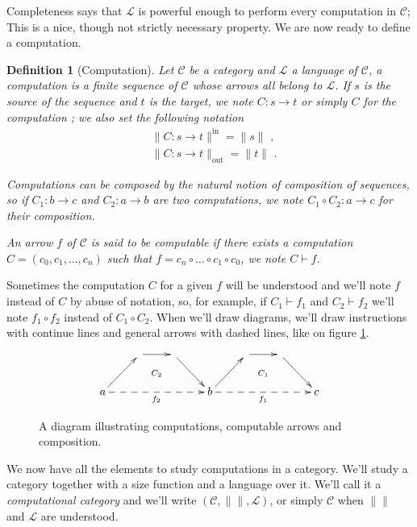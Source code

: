 \documentclass{article}
\newcommand{\cat}[1]{\mathscr{#1}}
\newcommand{\C}{\cat{C}}
\renewcommand{\L}{\cat{L}}
\newcommand{\comp}{\circ}
\newcommand{\size}[1]{\lVert#1\rVert}
\newcommand{\sizein}[1]{\size{#1}^\mathrm{in}}
\newcommand{\sizeout}[1]{\size{#1}_\mathrm{out}}
\newcommand{\ra}{\rightarrow}
\newcommand{\computes}{\vdash}
\newtheorem{definition}{Definition}
\begin{document}
  Completeness says that $\L$ is powerful enough to perform every
  computation in $\C$; This is a nice, though not strictly necessary
  property. We are now ready to define a computation.

  \begin{definition}[Computation]
    Let $\C$ be a category and $\L$ a language of $\C$, a
    \emph{computation} is a finite sequence of $\C$ whose arrows all
    belong to $\L$. If $s$ is the source of the sequence and $t$ is
    the target, we note $C:s\ra t$ or simply $C$ for the
    computation ; we also set the following notation
    \begin{align*}
      &\sizein{C:s\ra t} = \size{s} \text{ ,}\\
      &\sizeout{C:s\ra t} = \size{t} \text{ .}
    \end{align*}
    
    Computations can be composed by the natural notion of composition
    of sequences, so if $C_1 : b\ra c$ and $C_2 : a\ra b$ are two
    computations, we note $C_1\comp C_2 : a\ra c$ for their
    composition.

    An arrow $f$ of $\C$ is said to be \emph{computable} if there
    exists a computation $C = (c_0, c_1,\ldots,c_n)$ such that $f =
    c_n\comp\ldots\comp c_1\comp c_0$, we note $C\computes f$.
  \end{definition}

  Sometimes the computation $C$ for a given $f$ will be understood and
  we'll note $f$ instead of $C$ by abuse of notation, so, for example,
  if $C_1\computes f_1$ and $C_2\computes f_2$ we'll note $f_1\comp
  f_2$ instead of $C_1\comp C_2$. When we'll draw diagrams, we'll draw
  instructions with continue lines and general arrows with dashed
  lines, like on figure \ref{fig:comp}.
  \begin{figure}[!h]
    \[\xymatrix{
      & \ar[r]\ar@{}[dr]|{C_2} & \ar[dr] &
      & \ar[r]\ar@{}[dr]|{C_1} & \ar[dr] \\
      a \ar[ur]\ar@{-->}[rrr]_{f_2} &&& b
      \ar[ur]\ar@{-->}[rrr]_{f_1} &&& c
    }\]
    \caption{\label{fig:comp}A diagram illustrating computations,
    computable arrows and composition.}
  \end{figure}
  
  We now have all the elements to study computations in a
  category. We'll study a category together with a size function and a
  language over it. We'll call it a \emph{computational category} and
  we'll write $(\C, \size{}, \L)$, or simply $\C$ when $\size{}$ and
  $\L$ are understood.
\end{document}

